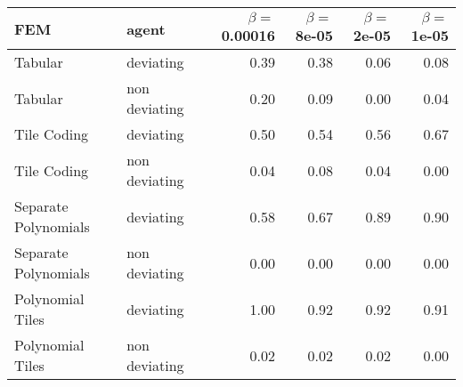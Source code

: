 \begin{tabular}{llrrrr}
  \hline
FEM & agent & $\beta =$ 0.00016 & $\beta =$ 8e-05 & $\beta =$ 2e-05 & $\beta =$ 1e-05 \\ 
  \hline
Tabular & deviating & 0.39 & 0.38 & 0.06 & 0.08 \\ 
  Tabular & non deviating & 0.20 & 0.09 & 0.00 & 0.04 \\ 
  Tile Coding & deviating & 0.50 & 0.54 & 0.56 & 0.67 \\ 
  Tile Coding & non deviating & 0.04 & 0.08 & 0.04 & 0.00 \\ 
  Separate Polynomials & deviating & 0.58 & 0.67 & 0.89 & 0.90 \\ 
  Separate Polynomials & non deviating & 0.00 & 0.00 & 0.00 & 0.00 \\ 
  Polynomial Tiles & deviating & 1.00 & 0.92 & 0.92 & 0.91 \\ 
  Polynomial Tiles & non deviating & 0.02 & 0.02 & 0.02 & 0.00 \\ 
   \hline
\end{tabular}
